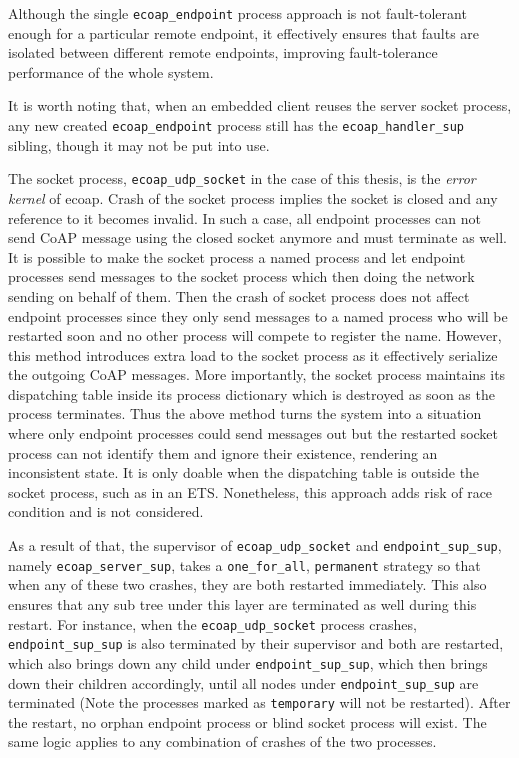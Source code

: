 Although the single \verb|ecoap_endpoint| process approach is not fault-tolerant enough for a particular remote endpoint, it effectively ensures that faults are isolated between different remote endpoints, improving fault-tolerance performance of the whole system. 

It is worth noting that, when an embedded client reuses the server socket process, any new created \verb|ecoap_endpoint| process still has the \verb|ecoap_handler_sup| sibling, though it may not be put into use. 

The socket process, \verb|ecoap_udp_socket| in the case of this thesis, is the \textit{error kernel} of ecoap. Crash of the socket process implies the socket is closed and any reference to it becomes invalid. In such a case, all endpoint processes can not send CoAP message using the closed socket anymore and must terminate as well. It is possible to make the socket process a named process and let endpoint processes send messages to the socket process which then doing the network sending on behalf of them. Then the crash of socket process does not affect endpoint processes since they only send messages to a named process who will be restarted soon and no other process will compete to register the name. However, this method introduces extra load to the socket process as it effectively serialize the outgoing CoAP messages. More importantly, the socket process maintains its dispatching table inside its process dictionary which is destroyed as soon as the process terminates. Thus the above method turns the system into a situation where only endpoint processes could send messages out but the restarted socket process can not identify them and ignore their existence, rendering an inconsistent state. It is only doable when the dispatching table is outside the socket process, such as in an ETS. Nonetheless, this approach adds risk of race condition and is not considered. 

As a result of that, the supervisor of \verb|ecoap_udp_socket| and \verb|endpoint_sup_sup|, namely \verb|ecoap_server_sup|, takes a \verb|one_for_all|, \verb|permanent| strategy so that when any of these two crashes, they are both restarted immediately. This also ensures that any sub tree under this layer are terminated as well during this restart. For instance, when the \verb|ecoap_udp_socket| process crashes, \verb|endpoint_sup_sup| is also terminated by their supervisor and both are restarted, which also brings down any child under \verb|endpoint_sup_sup|, which then brings down their children accordingly, until all nodes under \verb|endpoint_sup_sup| are terminated (Note the processes marked as \verb|temporary| will not be restarted). After the restart, no orphan endpoint process or blind socket process will exist. The same logic applies to any combination of crashes of the two processes. 

